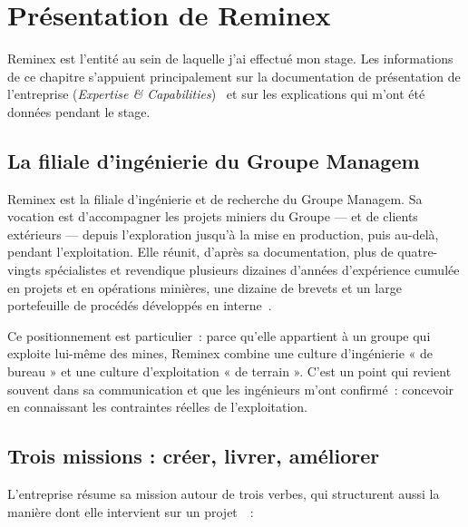 \chapter{Présentation de Reminex}
\label{chap:reminex}

Reminex est l'entité au sein de laquelle j'ai effectué mon stage. Les informations de ce chapitre s'appuient principalement sur la documentation de présentation de l'entreprise (\textit{Expertise \& Capabilities})~\cite{reminex_capabilities} et sur les explications qui m'ont été données pendant le stage.

\section{La filiale d'ingénierie du Groupe Managem}

Reminex est la filiale d'ingénierie et de recherche du Groupe Managem. Sa vocation est d'accompagner les projets miniers du Groupe --- et de clients extérieurs --- depuis l'exploration jusqu'à la mise en production, puis au-delà, pendant l'exploitation. Elle réunit, d'après sa documentation, plus de quatre-vingts spécialistes et revendique plusieurs dizaines d'années d'expérience cumulée en projets et en opérations minières, une dizaine de brevets et un large portefeuille de procédés développés en interne~\cite{reminex_capabilities}.

Ce positionnement est particulier~: parce qu'elle appartient à un groupe qui exploite lui-même des mines, Reminex combine une culture d'ingénierie « de bureau » et une culture d'exploitation « de terrain ». C'est un point qui revient souvent dans sa communication et que les ingénieurs m'ont confirmé~: concevoir en connaissant les contraintes réelles de l'exploitation.

\section{Trois missions : créer, livrer, améliorer}

L'entreprise résume sa mission autour de trois verbes, qui structurent aussi la manière dont elle intervient sur un projet~\cite{reminex_capabilities}~:

